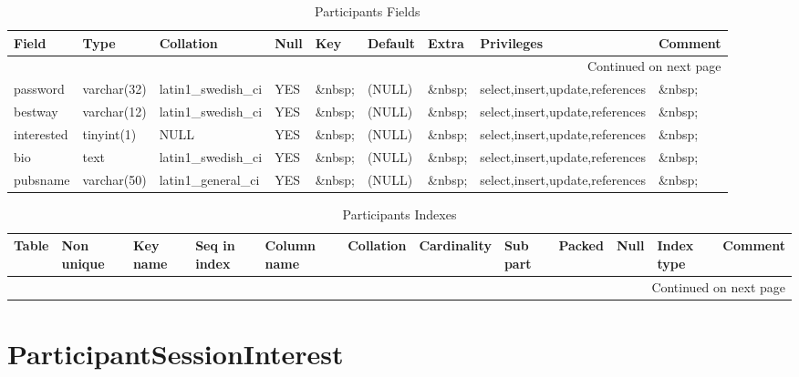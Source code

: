 \documentclass[tablesignature]{scrartcl}
\begin{document}
\begin{longtable}{|l|l|l|l|l|l|l|l|l|}
\caption{Participants Fields} \label{tbl:participantsfields}\\
\hline
 Field       &  Type         &  Collation                &  Null     &  Key      &  Default  &  Extra    &  Privileges                       &  Comment \\
\hline
\endhead
\hline\multicolumn{9}{r}{Continued on next page}\
\endfoot
\endlastfoot
\hline
 badgeid     &  varchar(15)  &  latin1\_{}swedish\_{}ci  &  \&nbsp;  &  PRI      &  \&nbsp;  &  \&nbsp;  &  select,insert,update,references  &  \&nbsp;  \\
 password    &  varchar(32)  &  latin1\_{}swedish\_{}ci  &  YES      &  \&nbsp;  &  (NULL)   &  \&nbsp;  &  select,insert,update,references  &  \&nbsp;  \\
 bestway     &  varchar(12)  &  latin1\_{}swedish\_{}ci  &  YES      &  \&nbsp;  &  (NULL)   &  \&nbsp;  &  select,insert,update,references  &  \&nbsp;  \\
 interested  &  tinyint(1)   &  NULL                     &  YES      &  \&nbsp;  &  (NULL)   &  \&nbsp;  &  select,insert,update,references  &  \&nbsp;  \\
 bio         &  text         &  latin1\_{}swedish\_{}ci  &  YES      &  \&nbsp;  &  (NULL)   &  \&nbsp;  &  select,insert,update,references  &  \&nbsp;  \\
 pubsname    &  varchar(50)  &  latin1\_{}general\_{}ci  &  YES      &  \&nbsp;  &  (NULL)   &  \&nbsp;  &  select,insert,update,references  &  \&nbsp;  \\
\hline
\end{longtable}


\begin{longtable}{|l|l|l|l|l|l|l|l|l|l|l|l|}
\caption{Participants Indexes} \label{tbl:participantsindexes}\\
\hline
 Table         &  Non unique  &  Key name  &  Seq in index  &  Column name  &  Collation  &  Cardinality  &  Sub part  &  Packed  &  Null     &  Index type  &  Comment \\
\hline
\endhead
\hline\multicolumn{12}{r}{Continued on next page}\
\endfoot
\endlastfoot
\hline
 Participants  &           0  &  PRIMARY   &             1  &  badgeid      &  A          &            2  &  (NULL)    &  (NULL)  &  \&nbsp;  &  BTREE       &  \&nbsp;  \\
\hline
\end{longtable}
\section{ParticipantSessionInterest}
\label{sec-11}
\end{document}
